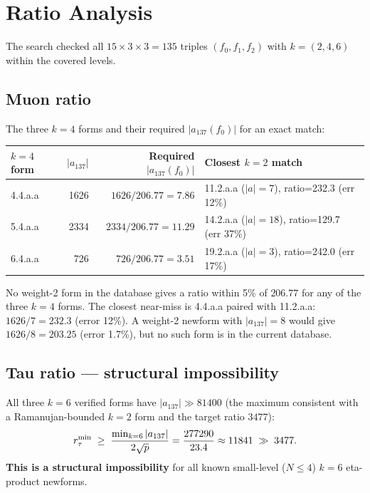 \documentclass[12pt,a4paper]{article}
\begin{document}
\section{Ratio Analysis}

The search checked all $15 \times 3 \times 3 = 135$ triples
$(f_0, f_1, f_2)$ with $k = (2,4,6)$ within the covered levels.

\subsection{Muon ratio}

The three $k=4$ forms and their required $|a_{137}(f_0)|$ for an exact match:
\begin{center}
\begin{tabular}{lrrl}
\toprule
$k=4$ form & $|a_{137}|$ & Required $|a_{137}(f_0)|$ & Closest $k=2$ match \\
\midrule
4.4.a.a & 1626 & $1626/206.77 = 7.86$ & 11.2.a.a ($|a|=7$), ratio=232.3 (err 12\%) \\
5.4.a.a & 2334 & $2334/206.77 = 11.29$ & 14.2.a.a ($|a|=18$), ratio=129.7 (err 37\%) \\
6.4.a.a & 726  & $726/206.77 = 3.51$  & 19.2.a.a ($|a|=3$), ratio=242.0 (err 17\%) \\
\bottomrule
\end{tabular}
\end{center}

\noindent No weight-2 form in the database gives a ratio within 5\% of
$206.77$ for any of the three $k=4$ forms.  The closest near-miss is
4.4.a.a paired with 11.2.a.a: $1626/7 = 232.3$ (error 12\%).  A weight-2
newform with $|a_{137}| = 8$ would give $1626/8 = 203.25$ (error 1.7\%),
but no such form is in the current database.

\subsection{Tau ratio --- structural impossibility}

All three $k=6$ verified forms have $|a_{137}| \gg 81400$ (the maximum
consistent with a Ramanujan-bounded $k=2$ form and the target ratio $3477$):
\[
  r_\tau^{\rm min}
  \;\ge\; \frac{\min_{k=6}|a_{137}|}{2\sqrt{p}}
  = \frac{277290}{23.4}
  \approx 11841 \;\gg\; 3477.
\]
\textbf{This is a structural impossibility} for all known small-level ($N \le 4$)
$k=6$ eta-product newforms.
\end{document}
